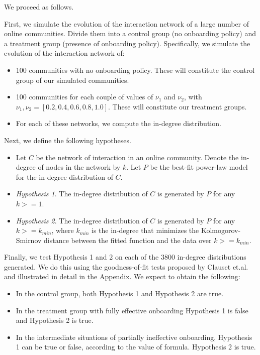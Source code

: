 We proceed as follows.

First, we simulate the evolution of the interaction network of a large number of online communities. Divide them into a control group (no onboarding policy) and a treatment group (presence of onboarding policy). Specifically, we simulate the evolution of the interaction network of:

\begin{itemize}
\item 100 communities with no onboarding policy. These will constitute the control group of our simulated communities. 
\item 100 communities for each couple of values of $\nu_1$  and $\nu_2$, with $\nu_1, \nu_2 = [0.2, 0.4, 0.6, 0.8, 1.0]$. These will constitute our treatment groups.
\item For each of these networks, we compute the in-degree distribution.
\end{itemize}

Next, we define the following hypotheses. 

\begin{itemize}
\item Let $C$ be the network of interaction in an online community. Denote the in-degree of nodes in the network by $k$. Let $P$ be the best-fit power-law model for the in-degree distribution of $C$.
\item \emph{Hypothesis 1}. The in-degree distribution of $C$ is generated by $P$ for any $k>=1$.
\item \emph{Hypothesis 2}. The in-degree distribution of $C$ is generated by $P$ for any $k>=k_{min}$, where $k_{min}$ is the in-degree that minimizes the Kolmogorov-Smirnov distance between the fitted function and the data over $k>=k_{min}$.
\end{itemize}

Finally, we test Hypothesis 1 and 2 on each of the 3800 in-degree distributions generated. We do this using the goodness-of-fit tests proposed by Clauset et.al. \cite{clauset2009power} and illustrated in detail in the Appendix.
We expect to obtain the following:

\begin{itemize}
\item In the control group, both Hypothesis 1 and Hypothesis 2 are true. 
\item In the treatment group with fully effective onboarding Hypothesis 1 is false and Hypothesis 2 is true. 
\item In the intermediate situations of partially ineffective onboarding, Hypothesis 1 can be true or false, according to the value of formula. Hypothesis 2 is true.
\end{itemize}


